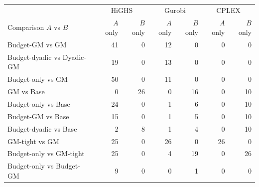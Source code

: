 \begin{tabular}{lrrrrrr}
\toprule
& \multicolumn{2}{c}{HiGHS} & \multicolumn{2}{c}{Gurobi} & \multicolumn{2}{c}{CPLEX} \\
Comparison $A$ vs $B$ & $A$ only & $B$ only & $A$ only & $B$ only & $A$ only & $B$ only \\
\midrule
Budget-GM vs GM & 41 & 0 & 12 & 0 & 0 & 0 \\
Budget-dyadic vs Dyadic-GM & 19 & 0 & 13 & 0 & 0 & 0 \\
Budget-only vs GM & 50 & 0 & 11 & 0 & 0 & 0 \\
GM vs Base & 0 & 26 & 0 & 16 & 0 & 10 \\
Budget-only vs Base & 24 & 0 & 1 & 6 & 0 & 10 \\
Budget-GM vs Base & 15 & 0 & 1 & 5 & 0 & 10 \\
Budget-dyadic vs Base & 2 & 8 & 1 & 4 & 0 & 10 \\
GM-tight vs GM & 25 & 0 & 26 & 0 & 26 & 0 \\
Budget-only vs GM-tight & 25 & 0 & 4 & 19 & 0 & 26 \\
Budget-only vs Budget-GM & 9 & 0 & 0 & 1 & 0 & 0 \\
\bottomrule
\end{tabular}
